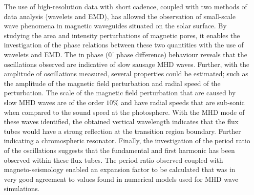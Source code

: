     The use of high-resolution data with short cadence, coupled with two methods of data analysis (wavelets and EMD), has allowed the observation of small-scale wave phenomena in magnetic waveguides situated on the solar surface.
    By studying the area and intensity perturbations of magnetic pores, it enables the investigation of the phase relations between these two quantities with the use of wavelets and EMD.
    The in phase ($0^\circ$ phase difference) behaviour reveals that the oscillations observed are indicative of slow sausage MHD waves. 
    Further, with the amplitude of oscillations measured, several properties could be estimated; such as the amplitude of the magnetic field perturbation and radial speed of the perturbation.
    The scale of the magnetic field perturbation that are caused by slow MHD waves are of the order $10$\% and have radial speeds that are sub-sonic when compared to the sound speed at the photosphere.  
    With the MHD mode of these waves identified, the obtained vertical wavelength indicates that the flux tubes would have a strong reflection at the transition region boundary.
    Further indicating a chromospheric resonator. 
    Finally, the investigation of the period ratio of the oscillations suggests that the fundamental and first harmonic has been observed within these flux tubes.
    The period ratio observed coupled with magneto-seismology enabled an expansion factor to be calculated that was in very good agreement to values found in numerical models used for MHD wave simulations.